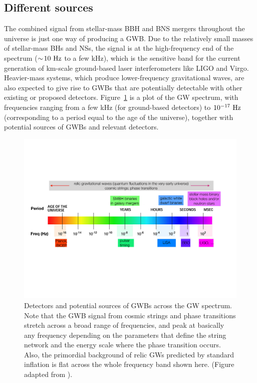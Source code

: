 \subsection{Different sources}
\label{s:different_sources}

The combined signal from stellar-mass BBH and BNS 
mergers throughout the universe is just one way 
of producing a GWB.
Due to the relatively small masses of stellar-mass 
BHs and NSs, the signal is at the high-frequency 
end of the spectrum ($\sim\!10~{\rm Hz}$ to a few kHz), 
which is the sensitive band for the current generation 
of km-scale ground-based laser interferometers like 
LIGO and Virgo.
Heavier-mass systems, which produce lower-frequency 
gravitational waves, are also expected to give rise 
to GWBs that are potentially detectable with other 
existing or proposed detectors.
Figure~\ref{f:GWspectrum} is a plot of the GW 
spectrum, with frequencies ranging
from a few kHz (for ground-based detectors)
to $10^{-17}~{\rm Hz}$ (corresponding to a period
equal to the age of the universe), together with 
potential sources of GWBs and relevant detectors.  
%
\begin{figure}[htbp!]
\begin{center}
\includegraphics[width=\textwidth]{Figures/GWspectrum}
\caption{Detectors and potential sources of GWBs
across the GW spectrum.
Note that the GWB signal from cosmic strings and phase 
transitions stretch across a broad range of frequencies, 
and peak at basically any frequency depending on 
the parameters that define the string network and the 
energy scale where the phase transition occurs.
Also, the primordial background of relic GWs predicted 
by standard inflation is flat across the whole frequency 
band shown here.
(Figure adapted from \cite{Romano-Cornish:2017}).}
\label{f:GWspectrum}
\end{center}
\end{figure}
%

